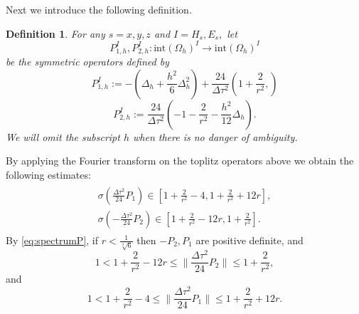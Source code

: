 \documentclass[12pt,reqno]{amsart}
\newtheorem{proposition}[theorem]{Proposition}
\newtheorem{defi}[theorem]{Definition}
\theoremstyle{definition}
\numberwithin{equation}{section}
\newcommand{\intr}[1]{\mathrm{int}(#1)}
\def\Gwh{\Omega_h}
\begin{document}
Next we introduce the following definition.
	\begin{defi}
	For any $s=x,y,z$ and $I= H_s, E_s,$
	let $$P_{1,h}^{I}, P_{2,h}^{I}:\intr\Gwh^{I}\to \intr\Gwh^{I}$$ be the symmetric operators defined by
	$$
	P_{1,h}^{I}:=-\left (\Delta_h+\frac{h^2}{6}\Delta_h^2\right)+\frac{24}{\Delta \tau^2}\left (
	1+\frac{2}{r^2},
	\right)
	$$
	$$
	P_{2,h}^{I}:=\frac{24}{\Delta \tau^2}\left (
	-1-\frac{2}{r^2}-\frac{h^2}{12}\Delta_h
	\right).
	$$	
We will omit the subscript $h$ when there is no danger of ambiguity.	
	
\end{defi}
By applying the Fourier transform on the toplitz operators above we obtain the following estimates:
\begin{align}
	\label{eq:spectrumP}
	\begin{split}
		\sigma(\frac{\Delta \tau^2}{24} P_1)\in [1+\frac{2}{r^2}-4,1+\frac{2}{r^2}+12r] ,
		\\
		\sigma(-\frac{\Delta \tau^2}{24} P_2)\in [1+\frac{2}{r^2}-12r, 1+\frac{2}{r^2}].
	\end{split}
\end{align}
By \eqref{eq:spectrumP}, if $r<\frac{1}{\sqrt[3]{6}}$
then $-P_2, P_1$ are positive definite, and
$$
1<1+\frac{2}{r^2}-12r\leq \|\frac{\Delta \tau^2}{24}P_2\|\leq 1+\frac{2}{r^2},
$$
and 
$$
1<1+\frac{2}{r^2}-4\leq\|\frac{\Delta \tau^2}{24}P_1\|\leq 1+\frac{2}{r^2}+12r.
$$





   
\end{document}
